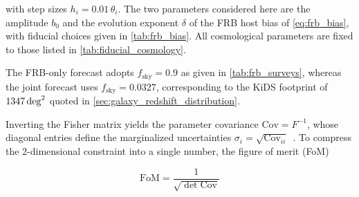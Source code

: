 with step sizes $h_i = 0.01\,\theta_i$. 
The two parameters considered here are the amplitude
$b_0$ and the evolution exponent $\delta$ of the FRB host bias of \autoref{eq:frb_bias},
with fiducial choices given in \autoref{tab:frb_bias}. All
cosmological parameters are fixed to those listed in \autoref{tab:fiducial_cosmology}.

The FRB-only forecast adopts $f_{\mathrm{sky}} = 0.9$ as given in \autoref{tab:frb_surveys}, whereas
the joint forecast uses $f_{\mathrm{sky}} = 0.0327$, 
corresponding to the KiDS footprint of $\qty{1347}{\deg\squared}$ quoted in
\autoref{sec:galaxy_redshift_distribution}.

Inverting the Fisher matrix yields the parameter covariance $\mathrm{Cov} = F^{-1}$, whose
diagonal entries define the marginalized uncertainties $\sigma_i = \sqrt{\mathrm{Cov}_{ii}}$~\cite{Coe_2009}.
To compress the 2-dimensional constraint into a single number, the figure of merit (FoM)

\begin{equation}\label{eq:fom}
    \mathrm{FoM} = \frac{1}{\sqrt{\det \mathrm{Cov}}}
\end{equation}

